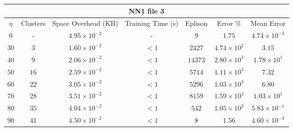 \begin{adjustwidth}{-1cm}{}
\begin{tabular}{ccccccc}
\hline
\multicolumn{7}{c}{NN1 file 3} \\
\toprule
$\eta$ & Clusters & Space Overhead (KB) & Training Time (s) & Eplison & Error \% & Mean Error\\
\midrule
$0$ & - & $4.95 \times 10^{-2}$ & - & $9$ & $1.75$ & $4.74 \times 10^{-3}$\\
$30$ & $3$ & $1.60 \times 10^{-2}$ & $<1$ & $2427$ & $4.74 \times 10^2$ & $3.15$\\
$40$ & $9$ & $2.06 \times 10^{-2}$ & $<1$ & $14373$ & $2.80 \times 10^3$ & $1.78 \times 10^1$\\
$50$ & $16$ & $2.59 \times 10^{-2}$ & $<1$ & $5714$ & $1.11 \times 10^3$ & $7.32$\\
$60$ & $22$ & $3.05 \times 10^{-2}$ & $<1$ & $5296$ & $1.03 \times 10^3$ & $6.80$\\
$70$ & $28$ & $3.51 \times 10^{-2}$ & $<1$ & $8159$ & $1.59 \times 10^3$ & $1.03 \times 10^1$\\
$80$ & $35$ & $4.04 \times 10^{-2}$ & $<1$ & $542$ & $1.05 \times 10^2$ & $5.83 \times 10^{-1}$\\
$90$ & $41$ & $4.50 \times 10^{-2}$ & $<1$ & $8$ & $1.56$ & $4.60 \times 10^{-3}$\\
\bottomrule
\end{tabular}
\end{adjustwidth}

\par\null\par
\par\null\par

